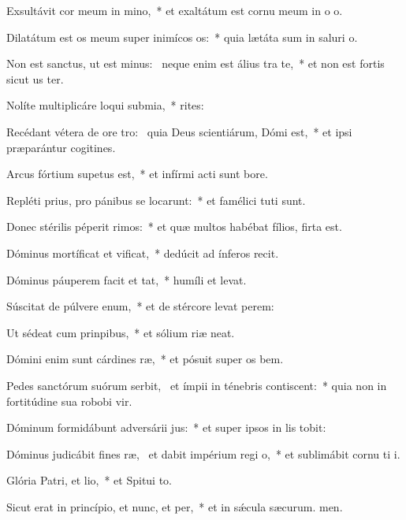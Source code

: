 \item Exsultávit cor meum in mino,~* et exaltátum est cornu meum in o o.
\item Dilatátum est os meum super inimícos os:~* quia lætáta sum in saluri o.
\item Non est sanctus, ut est minus:~\pscross{} neque enim est álius tra te,~* et non est fortis sicut us ter.
\item Nolíte multiplicáre loqui submia,~* rites:
\item Recédant vétera de ore tro:~\pscross{} quia Deus scientiárum, Dómi est,~* et ipsi præparántur cogitines.
\item Arcus fórtium supetus est,~* et infírmi acti sunt bore.
\item Repléti prius, pro pánibus se locarunt:~* et famélici tuti sunt.
\item Donec stérilis péperit rimos:~* et quæ multos habébat fílios, firta est.
\item Dóminus mortíficat et vificat,~* dedúcit ad ínferos  recit.
\item Dóminus páuperem facit et tat,~* humíli et levat.
\item Súscitat de púlvere enum,~* et de stércore levat perem:
\item Ut sédeat cum prinpibus,~* et sólium riæ neat.
\item Dómini enim sunt cárdines ræ,~* et pósuit super os bem.
\item Pedes sanctórum suórum serbit,~\pscross{} et ímpii in ténebris contiscent:~* quia non in fortitúdine sua robobi vir.
\item Dóminum formidábunt adversárii jus:~* et super ipsos in lis tobit:
\item Dóminus judicábit fines ræ,~\pscross{} et dabit impérium regi o,~* et sublimábit cornu ti i.
\item Glória Patri, et lio,~* et Spitui to.
\item Sicut erat in princípio, et nunc, et per,~* et in sǽcula sæcurum. men.
